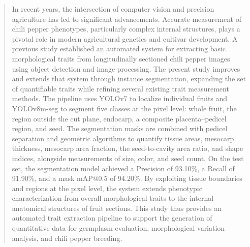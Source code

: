 \documentclass[final,1p,11pt,longtitle]{elsarticle}
\begin{document}
\begin{frontmatter}
\begin{abstract}
In recent years, the intersection of computer vision and precision agriculture has led to significant advancements. Accurate measurement of chili pepper phenotypes, particularly complex internal structures, plays a pivotal role in modern agricultural genetics and cultivar development. A previous study established an automated system for extracting basic morphological traits from longitudinally sectioned chili pepper images using object detection and image processing. The present study improves and extends that system through instance segmentation, expanding the set of quantifiable traits while refining several existing trait measurement methods. The pipeline uses YOLOv7 to localize individual fruits and YOLOv8m-seg to segment five classes at the pixel level: whole fruit, the region outside the cut plane, endocarp, a composite placenta--pedicel region, and seed. The segmentation masks are combined with pedicel separation and geometric algorithms to quantify tissue areas, mesocarp thickness, mesocarp area fraction, the seed-to-cavity area ratio, and shape indices, alongside measurements of size, color, and seed count. On the test set, the segmentation model achieved a Precision of 93.10\%, a Recall of 91.90\%, and a mask mAP@0.5 of 94.20\%. By exploiting tissue boundaries and regions at the pixel level, the system extends phenotypic characterization from overall morphological traits to the internal anatomical structures of fruit sections. This study thus provides an automated trait extraction pipeline to support the generation of quantitative data for germplasm evaluation, morphological variation analysis, and chili pepper breeding.


\end{abstract}
\end{frontmatter}
\end{document}
